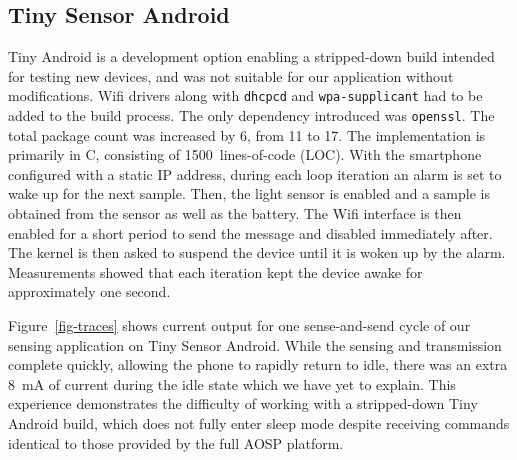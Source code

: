 \subsection{Tiny Sensor Android}
\label{subsec-tiny}

Tiny Android is a development option enabling a stripped-down build intended
for testing new devices, and was not suitable for our application without
modifications. Wifi drivers along with \texttt{dhcpcd} and
\texttt{wpa-supplicant} had to be added to the build process. The only
dependency introduced was \texttt{openssl}. The total package count was
increased by 6, from 11 to 17. The implementation is primarily in C,
consisting of 1500~lines-of-code (LOC). With the smartphone configured with a
static IP address, during each loop iteration an alarm is set to wake up for
the next sample. Then, the light sensor is enabled and a sample is obtained
from the sensor as well as the battery. The Wifi interface is then enabled
for a short period to send the message and disabled immediately after. The
kernel is then asked to suspend the device until it is woken up by the alarm.
Measurements showed that each iteration kept the device awake for
approximately one second.

Figure~\ref{fig-traces} shows current output for one sense-and-send cycle of
our sensing application on Tiny Sensor Android. While the sensing and
transmission complete quickly, allowing the phone to rapidly return to idle,
there was an extra 8~mA of current during the idle state which we have yet to
explain. This experience demonstrates the difficulty of working with a
stripped-down Tiny Android build, which does not fully enter sleep mode
despite receiving commands identical to those provided by the full AOSP
platform.

